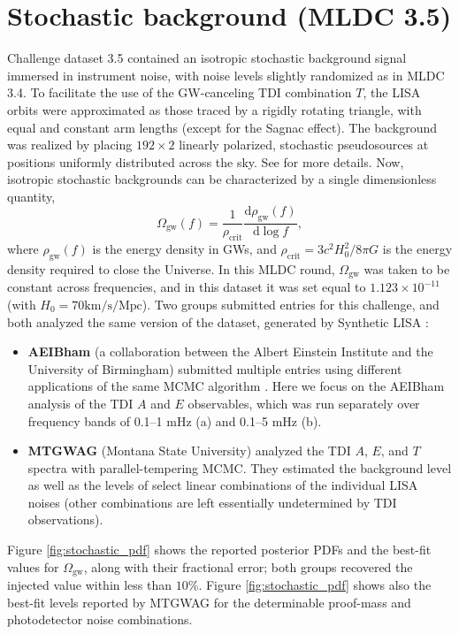 \documentclass{iopart}
\begin{document}
\section{Stochastic background (MLDC 3.5)}

Challenge dataset 3.5 contained an isotropic stochastic background signal immersed in instrument noise, with noise levels slightly randomized as in MLDC 3.4.
To facilitate the use of the GW-canceling TDI combination $T$, 
the LISA orbits were approximated as those traced by a rigidly rotating
triangle, with equal and constant arm lengths (except for the Sagnac effect). The background was realized by placing $192 \times 2$ linearly polarized, stochastic pseudosources at positions uniformly distributed across the sky. See \cite{MLDC3} for more details. Now, isotropic stochastic backgrounds can be characterized by a single dimensionless quantity,
%
\begin{equation}
\Omega_{\mathrm{gw}}(f)=\frac{1}{\rho_{\mathrm{crit}}}\frac{\mathrm{d} \rho_{\mathrm{gw}}(f)}{\mathrm{d} \log{f}},
\end{equation}
%
where $\rho_{\mathrm{gw}}(f)$ is the energy density in GWs,
and $\rho_{\mathrm{crit}}=3c^2H_0^2/8\pi G$ is the energy density required
to close the Universe. In this MLDC round, $\Omega_{\mathrm{gw}}$ was taken to be constant across frequencies, and in this dataset it was set equal to $1.123 \times 10^{-11}$ (with $H_0=70 \mathrm{km}/\mathrm{s}/\mathrm{Mpc}$). Two groups submitted entries for this challenge, and both analyzed the same version of the dataset, generated by Synthetic LISA \cite{synthlisa}:
%
\begin{itemize}
\item \textbf{AEIBham} (a collaboration between the Albert Einstein Institute
and the University of Birmingham) submitted multiple entries using different applications of the same MCMC algorithm \cite{Robinson2008}. Here we focus on the AEIBham analysis of the TDI $A$ and $E$ observables, which was run separately over frequency bands of 0.1--1 mHz (a) and 0.1--5 mHz (b).
\item \textbf{MTGWAG} (Montana State University) analyzed the TDI $A$, $E$, and $T$ spectra with parallel-tempering MCMC. They estimated the background level as well as the levels of select linear combinations of the individual LISA noises (other combinations are left essentially undetermined by TDI observations).
\end{itemize}
%
Figure \ref{fig:stochastic_pdf} shows the reported posterior PDFs and the best-fit values for $\Omega_{\mathrm{gw}}$, along with their fractional error; both groups recovered the injected value within less than $10\%$. Figure \ref{fig:stochastic_pdf} shows also the best-fit levels reported by MTGWAG for the determinable proof-mass and photodetector noise combinations.
\end{document}

